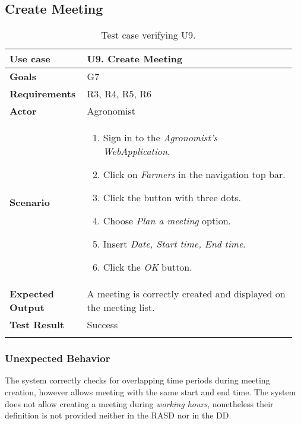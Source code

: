 \subsection{Create Meeting}
\begin{longtable}{@{}p{0.25\linewidth}p{0.71\linewidth}@{}}
	\toprule
	\textbf{Use case} & \textbf{U9.} Create Meeting\\
	\midrule
	\textbf{Goals} & G7\\
	\midrule
	\textbf{Requirements} & R3, R4, R5, R6\\
	\midrule
	\textbf{Actor} & Agronomist\\
	\midrule
	\textbf{Scenario} &
	\begin{enumerate}[leftmargin=.4cm,noitemsep,topsep=0pt,before=\vspace{-3mm},after=\vspace{-4mm}]
		\item Sign in to the \textit{Agronomist's WebApplication}.
		\item Click on \textit{Farmers} in the navigation top bar.
		\item Click the button with three dots.
		\item Choose \textit{Plan a meeting} option.
		\item Insert \textit{Date, Start time, End time}.
		\item Click the \textit{OK} button.
 	\end{enumerate}\\
	\midrule
	\textbf{Expected Output} & A meeting is correctly created and displayed on the meeting list.\\
	\midrule
	\textbf{Test Result} & Success\\
	\bottomrule
    \caption{Test case verifying U9.}
\end{longtable}

\subsubsection*{Unexpected Behavior}
The system correctly checks for overlapping time periods during meeting creation, however allows meeting with the same start and end time. The system does not allow creating a meeting during \textit{working hours}, nonetheless their definition is not provided neither in the RASD nor in the DD. 


